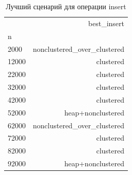 \begin{table}
\caption{Лучший сценарий для операции insert}
\label{tab:best-insert}
\begin{tabular}{lr}
\toprule
 & best_insert \\
n &  \\
\midrule
2000 & nonclustered_over_clustered \\
12000 & clustered \\
22000 & clustered \\
32000 & clustered \\
42000 & clustered \\
52000 & heap+nonclustered \\
62000 & nonclustered_over_clustered \\
72000 & clustered \\
82000 & clustered \\
92000 & heap+nonclustered \\
\bottomrule
\end{tabular}
\end{table}
